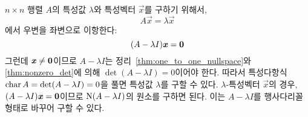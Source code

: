 \documentclass[../engineering_mathematics_lecture_note.tex]{subfiles}
\begin{document}
\begin{remark}
    $n \times n$ 행렬 $A$의 특성값 $\lambda$와 특성벡터 $\vec x$를 구하기 위해서,
    \begin{equation*}
        A \vec x = \lambda \vec x
    \end{equation*}
    에서 우변을 좌변으로 이항한다:
    \begin{equation*}
        (A - \lambda I) \bm{\mathit{x}} = \bm{\mathrm{0}}
    \end{equation*}
    그런데 $\bm{\mathit{x}} \neq \bm{\mathrm{0}}$이므로 $A - \lambda I$는 정리~\ref{thm:one_to_one_nullspace}와 \ref{thm:nonzero_det}에 의해 $\det (A - \lambda I) = 0$이어야 한다.
    따라서 특성다항식 $\operatorname{char} A = \det (A - \lambda I) = 0$을 풀면 특성값 $\lambda$를 구할 수 있다.
    $\lambda$-특성벡터 $\vec x$의 경우, $(A - \lambda I) \bm{\mathit{x}} = \bm{\mathrm{0}}$이므로 $\operatorname{N} (A - \lambda I)$의 원소를 구하면 된다.
    이는 $A - \lambda I$를 행사다리꼴 형태로 바꾸어 구할 수 있다.
\end{remark}
\end{document}
